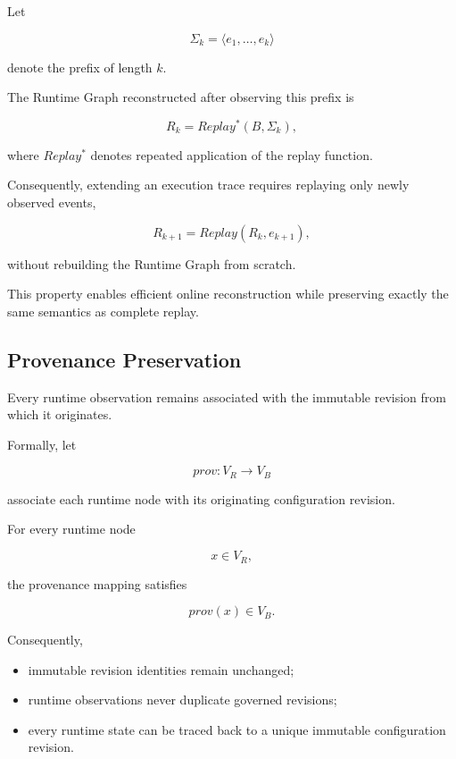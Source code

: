 \documentclass[10pt]{article}
\begin{document}
Let

\begin{equation}
\Sigma_k
=
\langle
e_1,\ldots,e_k
\rangle
\end{equation}

denote the prefix of length $k$.

The Runtime Graph reconstructed after observing this prefix is

\begin{equation}
R_k
=
Replay^*
(
B,
\Sigma_k
),
\end{equation}

where $Replay^*$ denotes repeated application of the replay function.

Consequently, extending an execution trace requires replaying only newly
observed events,

\begin{equation}
R_{k+1}
=
Replay(R_k,e_{k+1}),
\end{equation}

without rebuilding the Runtime Graph from scratch.

This property enables efficient online reconstruction while preserving exactly
the same semantics as complete replay.

\subsection{Provenance Preservation}
\label{appendix:runtime_provenance}

Every runtime observation remains associated with the immutable revision from
which it originates.

Formally, let

\begin{equation}
prov
:
V_R
\rightarrow
V_B
\end{equation}

associate each runtime node with its originating configuration revision.

For every runtime node

\[
x\in V_R,
\]

the provenance mapping satisfies

\begin{equation}
prov(x)
\in
V_B.
\end{equation}

Consequently,

\begin{itemize}
	\item immutable revision identities remain unchanged;
	\item runtime observations never duplicate governed revisions;
	\item every runtime state can be traced back to a unique immutable
	configuration revision.
\end{itemize}
\end{document}
